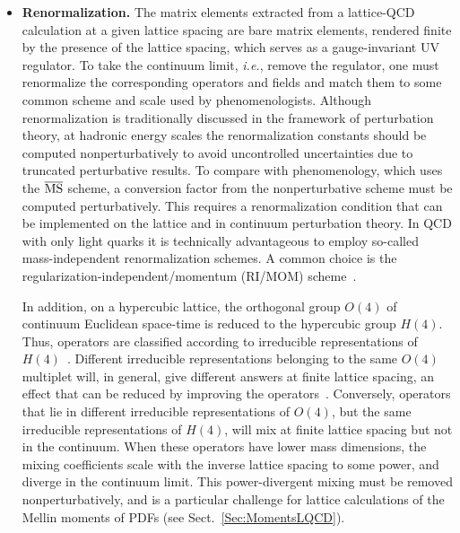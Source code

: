 \begin{itemize}
\item {\bfseries Renormalization.} The matrix elements extracted from a 
lattice-QCD calculation at a given lattice spacing are bare matrix elements,
rendered finite by the presence of the lattice spacing, which serves
as a gauge-invariant UV regulator. 
%
To take the continuum limit, {\it i.e.}, remove the regulator, one must 
renormalize the corresponding operators and fields and match them to some 
common scheme and scale used by phenomenologists. 
%
Although renormalization is traditionally
discussed in the framework of perturbation theory, at hadronic energy
scales the renormalization constants should be computed
nonperturbatively to avoid uncontrolled uncertainties due to 
truncated perturbative results.
%
To compare with phenomenology, which uses the $\overline{\rm MS}$ scheme, 
a conversion factor from the nonperturbative scheme must be computed 
perturbatively. 
%
This requires a renormalization condition that can be implemented on the 
lattice and in continuum perturbation theory. 
%
In QCD with only light quarks it is technically advantageous to employ 
so-called mass-independent renormalization schemes. 
%
A common choice is the regularization-independent/momentum (RI/MOM) 
scheme~\cite{Martinelli:1994ty}.

In addition, on a hypercubic lattice, the orthogonal group $O(4)$ of
continuum Euclidean space-time is reduced to the hypercubic group
$H(4)$.
%
Thus, operators are classified according to irreducible
representations of $H(4)$~\cite{Gockeler:1996mu}.
%
Different irreducible representations belonging to the same $O(4)$ multiplet
will, in general, give different answers at finite lattice spacing, an effect 
that can be reduced by improving the operators~\cite{Gockeler:2004wp}.
%
Conversely, operators that lie in different irreducible representations of 
$O(4)$, but the same irreducible representations of $H(4)$, will mix at finite 
lattice spacing but not in the continuum. 
%
When these operators have lower mass dimensions,
the mixing coefficients scale with the inverse lattice spacing to some
power, and diverge in the continuum limit.
%
This power-divergent mixing
must be removed nonperturbatively, and is a particular challenge for
lattice calculations of the Mellin moments of PDFs (see
Sect.~\ref{Sec:MomentsLQCD}).



\end{itemize}

